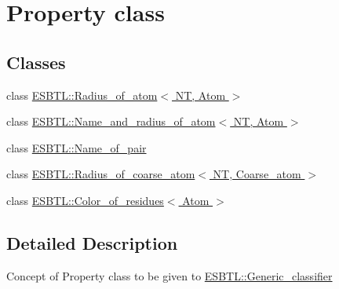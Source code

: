 \hypertarget{group__prop__classif}{}\section{Property class}
\label{group__prop__classif}
\subsection*{Classes}
\begin{DoxyCompactItemize}
\item 
class \hyperlink{classESBTL_1_1Radius__of__atom}{E\+S\+B\+T\+L\+::\+Radius\+\_\+of\+\_\+atom$<$ N\+T, Atom $>$}
\item 
class \hyperlink{classESBTL_1_1Name__and__radius__of__atom}{E\+S\+B\+T\+L\+::\+Name\+\_\+and\+\_\+radius\+\_\+of\+\_\+atom$<$ N\+T, Atom $>$}
\item 
class \hyperlink{classESBTL_1_1Name__of__pair}{E\+S\+B\+T\+L\+::\+Name\+\_\+of\+\_\+pair}
\item 
class \hyperlink{classESBTL_1_1Radius__of__coarse__atom}{E\+S\+B\+T\+L\+::\+Radius\+\_\+of\+\_\+coarse\+\_\+atom$<$ N\+T, Coarse\+\_\+atom $>$}
\item 
class \hyperlink{classESBTL_1_1Color__of__residues}{E\+S\+B\+T\+L\+::\+Color\+\_\+of\+\_\+residues$<$ Atom $>$}
\end{DoxyCompactItemize}


\subsection{Detailed Description}
Concept of Property class to be given to \hyperlink{structESBTL_1_1Generic__classifier}{E\+S\+B\+T\+L\+::\+Generic\+\_\+classifier}


